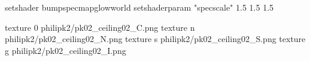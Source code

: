 setshader bumpspecmapglowworld
setshaderparam "specscale" 1.5 1.5 1.5


texture 0 philipk2/pk02_ceiling02_C.png
texture n philipk2/pk02_ceiling02_N.png
texture s philipk2/pk02_ceiling02_S.png
texture g philipk2/pk02_ceiling02_I.png


